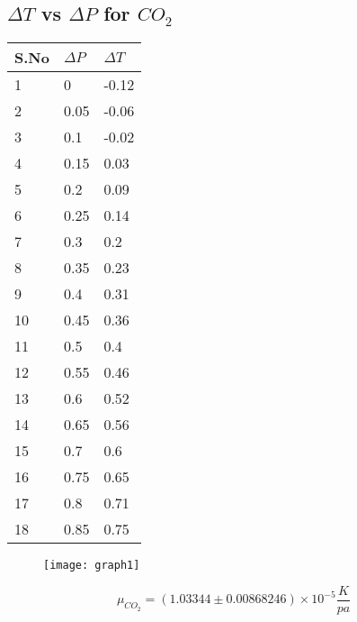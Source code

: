 \documentclass[
	letterpaper, %
	10pt, %
]{CSUniSchoolLabReport}
\begin{document}
\subsection{\(\Delta T\) vs \(\Delta P\) for \(CO_2\)   }
\begin{center}
	\begin{tabular}{ | m{1cm} | m{3cm}| m{3cm} | } 
		\hline
		S.No	&	\(\Delta P\)	&	\(\Delta T\) \\
		\hline
		1&0&-0.12\\
		2&0.05&-0.06\\
		3&0.1&-0.02\\
		4&0.15&0.03\\
		5&0.2&0.09\\
		6&0.25&0.14\\
		7&0.3&0.2\\
		8&0.35&0.23\\
		9&0.4&0.31\\
		10&0.45&0.36\\
		11&0.5&0.4\\
		12&0.55&0.46\\
		13&0.6&0.52\\
		14&0.65&0.56\\
		15&0.7&0.6\\
		16&0.75&0.65\\
		17&0.8&0.71\\
		18&0.85&0.75\\
		\hline
	\end{tabular}
\end{center}
\begin{figure}[H] %
	\centering %
	\texttt{[image: graph1]} %
	\caption{}
\end{figure}
\[
	\boxed{\mu_{CO_2} = (1.03344 \pm 0.00868246) \times  10^{-5} \frac{K}{pa}}
\]
\end{document}
